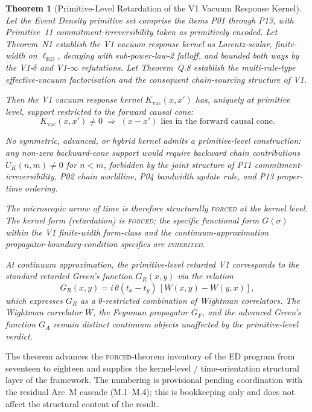 \documentclass[11pt,a4paper]{article}
\newtheorem{theorem}{Theorem}
\begin{document}
\begin{theorem}[Primitive-Level Retardation of the V1 Vacuum Response Kernel]
Let the Event Density primitive set comprise the items P01 through P13, with Primitive~11 commitment-irreversibility taken as primitively encoded. Let Theorem~N1 establish the V1 vacuum response kernel as Lorentz-scalar, finite-width on $\ell_\mathrm{ED}$, decaying with sub-power-law-2 falloff, and bounded both ways by the V1-$\delta$ and V1-$\infty$ refutations. Let Theorem~Q.8 establish the multi-rule-type effective-vacuum factorisation and the consequent chain-sourcing structure of V1.

Then the V1 vacuum response kernel $K_\mathrm{vac}(x, x')$ has, uniquely at primitive level, support restricted to the forward causal cone:
\[
K_\mathrm{vac}(x, x') \neq 0 \;\Longrightarrow\; (x - x') \text{ lies in the forward causal cone}.
\]

No symmetric, advanced, or hybrid kernel admits a primitive-level construction: any non-zero backward-cone support would require backward chain contributions $U_K(n, m) \neq 0$ for $n < m$, forbidden by the joint structure of P11 commitment-irreversibility, P02 chain worldline, P04 bandwidth update rule, and P13 proper-time ordering.

The microscopic arrow of time is therefore structurally \textsc{forced} at the kernel level. The kernel form (retardation) is \textsc{forced}; the specific functional form $G(\sigma)$ within the V1 finite-width form-class and the continuum-approximation propagator-boundary-condition specifics are \textsc{inherited}.

At continuum approximation, the primitive-level retarded V1 corresponds to the standard retarded Green's function $G_R(x, y)$ via the relation
\[
G_R(x, y) = i\,\theta(t_x - t_y)\,[W(x, y) - W(y, x)],
\]
which expresses $G_R$ as a $\theta$-restricted combination of Wightman correlators. The Wightman correlator $W$, the Feynman propagator $G_F$, and the advanced Green's function $G_A$ remain distinct continuum objects unaffected by the primitive-level verdict.
\end{theorem}

The theorem advances the \textsc{forced}-theorem inventory of the ED program from seventeen to eighteen and supplies the kernel-level / time-orientation structural layer of the framework. The numbering is provisional pending coordination with the residual Arc~M cascade (M.1--M.4); this is bookkeeping only and does not affect the structural content of the result.
\end{document}
